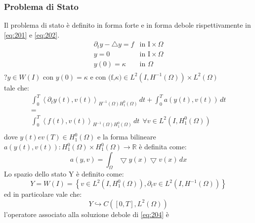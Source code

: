 \subsubsection{Problema di Stato}
Il problema di stato è definito in forma forte e in forma debole rispettivamente in \ref{eq:201} e \ref{eq:202}.
\begin{equation}
\begin{array}{cc}
 	{\partial_{t}}y - {\bigtriangleup}y = f & \text{in I}\times\Omega \\
	y=0 & \text{in I}\times\Omega \\
	y(0) = \kappa & \text{in }\Omega \\
\end{array}
\label{eq:201}
\end{equation}
$\text{?} y \in W(I) \text{ con } y(0)=\kappa \text{ e } \text{con (f,}\kappa) \in L^2(I,{H^{-1}(\Omega)})\times {L^{2}(\Omega)}$ \\
tale che:
\begin{equation}
\begin{array}{c}
	\int_{0}^{T} \left \langle {\partial_{t}}y(t),v(t) \right \rangle_{{H^{-1}(\Omega)}{H^{0}_{1}(\Omega)}} \, dt +  	\int_{0}^{T} a(y(t),v(t)) \, dt  \\
	 = \\
	\int_{0}^{T} \left \langle f(t),v(t) \right \rangle_{{H^{-1}(\Omega)}{H^{0}_{1}(\Omega)}} \, dt \ \ \forall v \in L^2(I,{H^{0}_{1}(\Omega)}) \\
\end{array}
\label{eq:202}
\end{equation}
dove $y(t) e v(T) \in {H^{0}_{1}(\Omega)}$ e la forma bilineare $a(y(t),v(t)): {H^{0}_{1}(\Omega)}{\times}{H^{0}_{1}(\Omega)}\rightarrow\mathbb{R}$ è definita come:
\begin{equation}
 a(y,v) = \int_{\Omega} {\bigtriangledown}y(x){\bigtriangledown}v(x) \, dx
\label{eq:203}
\end{equation}
Lo spazio dello stato Y è definito come:
\begin{equation}
Y = W(I) =  \left\{ v \in L^2(I, {H^{0}_{1}(\Omega)}), {{\partial}_{t}}v \in L^2(I, {H^{-1}(\Omega)}) \right\}
\label{eq:204}
\end{equation}
ed in particolare vale che:
\begin{equation}
Y \hookrightarrow C(\left[0,T\right], {L^{2}(\Omega)})
\label{eq:205}
\end{equation}
l'operatore associato alla soluzione debole di \ref{eq:204} è  
